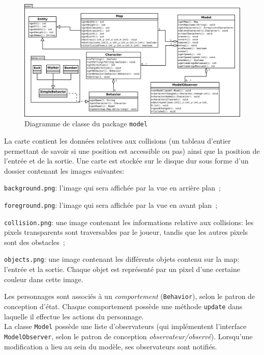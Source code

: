 \documentclass[a4paper,12pt]{article}
\begin{document}
\begin{figure}[ht!]
  \centerline{
  \includegraphics[width=\textwidth]{model.png}}
  \caption{Diagramme de classe du package \texttt{model}}
\end{figure}

La carte contient les données relatives aux collisions (un tableau
d'entier permettant de savoir si une position est accessible ou pas)
ainsi que la position de l'entrée et de la sortie. Une carte est
stockée sur le disque dur sous forme d'un dossier contenant les images
suivantes:
\begin{list}{-}{}
  \item \texttt{background.png}: l'image qui sera affichée par la vue
    en arrière plan~;
  \item \texttt{foreground.png}: l'image qui sera affichée par la vue
    en avant plan~;
  \item \texttt{collision.png}: une image contenant les informations
    relative aux collisions: les pixels transparents sont traversables
    par le joueur, tandis que les autres pixels sont des obstacles~;
  \item \texttt{objects.png}: une image contenant les différents
    objets contenu sur la map: l'entrée et la sortie.  Chaque objet
    est représenté par un pixel d'une certaine couleur dans cette
    image.
\end{list}

Les personnages sont associés à un \emph{comportement}
(\texttt{Behavior}), selon le patron de conception d'état. Chaque
comportement possède une méthode \texttt{update} dans laquelle il
effectue les actions du personnage.\\

La classe \texttt{Model} possède une liste d'observateurs (qui
implémentent l'interface \texttt{ModelObserver}, selon le patron de
conception \emph{observateur/observé}). Lorsqu'une modification a lieu
au sein du modèle, ses observateurs sont notifiés.\\
\end{document}
